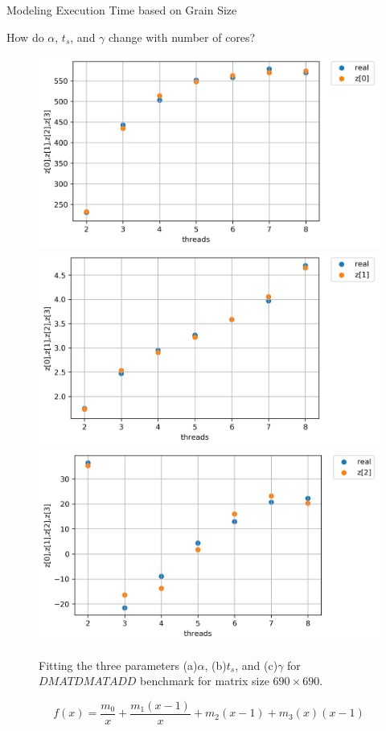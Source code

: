 \documentclass[10pt]{beamer}
\begin{document}
\begin{frame}{Modeling Execution Time based on Grain Size}
	\begin{outline}	
	How do $\alpha$, $t_s$, and $\gamma$ change with number of cores?	
	\begin{figure}[H]
		\centering
		{\includegraphics[scale=.3]{images/bathtub/coef_1_690.png}\label{fig24:a}}
		{\includegraphics[scale=.3]{images/bathtub/coef_2_690.png}\label{fig24:b}}	
		{\includegraphics[scale=.3]{images/bathtub/coef_3_690.png}\label{fig24:c}}
		\caption{Fitting the three parameters (a)$\alpha$, (b)$t_s$, and (c)$\gamma$ for $DMATDMATADD$ benchmark for matrix size $690\times690$.}	
		\label{fig24}
	\end{figure}
	
	
$$f(x)=\frac{m_0}{x}+\frac{m_1(x-1)}{x}+m_2(x-1)+m_3(x)(x-1)$$
\end{outline}
\end{frame}
\end{document}
